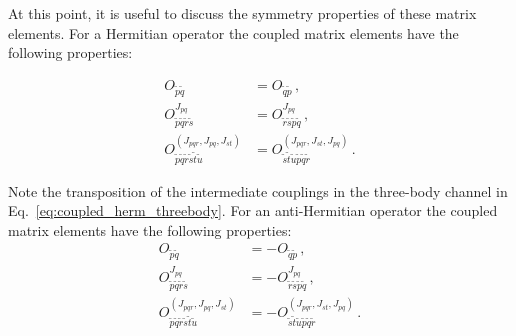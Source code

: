 At this point, it is useful to discuss the symmetry properties
of these matrix elements.
For a Hermitian operator
the coupled matrix elements have the following properties:
\begin{samepage}
  \begin{subequations}
    \begin{align}
      O_{\tilde{p}\tilde{q}}                                                                 & = O_{\tilde{q}\tilde{p}}\,, \\
      O^{J_{pq}}_{\tilde{p}\tilde{q}\tilde{r}\tilde{s}}                                      & =
      O^{J_{pq}}_{\tilde{r}\tilde{s}\tilde{p}\tilde{q}}\,,                                                                 \\
      O^{(J_{pqr}, J_{pq}, J_{st})}_{\tilde{p}\tilde{q}\tilde{r}\tilde{s}\tilde{t}\tilde{u}} & =
      O^{(J_{pqr}, J_{st}, J_{pq})}_{\tilde{s}\tilde{t}\tilde{u}\tilde{p}\tilde{q}\tilde{r}}\,.\label{eq:coupled_herm_threebody}
    \end{align}
  \end{subequations}
\end{samepage}
Note the transposition of the intermediate couplings
in the three-body channel in Eq.~\eqref{eq:coupled_herm_threebody}.
For an anti-Hermitian operator
the coupled matrix elements have the following properties:
\begin{subequations}
  \begin{align}
    O_{\tilde{p}\tilde{q}}                                                                 & = - O_{\tilde{q}\tilde{p}}\,, \\
    O^{J_{pq}}_{\tilde{p}\tilde{q}\tilde{r}\tilde{s}}                                      & =
    - O^{J_{pq}}_{\tilde{r}\tilde{s}\tilde{p}\tilde{q}}\,,                                                                 \\
    O^{(J_{pqr}, J_{pq}, J_{st})}_{\tilde{p}\tilde{q}\tilde{r}\tilde{s}\tilde{t}\tilde{u}} & =
    - O^{(J_{pqr}, J_{st}, J_{pq})}_{\tilde{s}\tilde{t}\tilde{u}\tilde{p}\tilde{q}\tilde{r}}\,.\label{eq:coupled_antiherm_threebody}
  \end{align}
\end{subequations}

